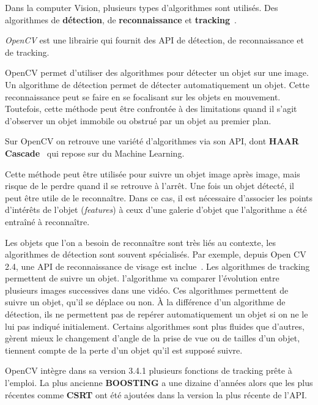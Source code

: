        Dans la computer Vision, plusieurs types d'algorithmes sont utilisés. Des algorithmes de \textbf{détection}, de \textbf{reconnaissance} et \textbf{tracking}~\cite{Reco}.

    \textit{OpenCV} est une librairie qui fournit des API de détection, de reconnaissance et de tracking.
    
        OpenCV permet d'utiliser des algorithmes pour détecter un objet sur une image. Un algorithme de détection permet de détecter automatiquement un objet. Cette reconnaissance peut se faire en se focalisant sur les objets en mouvement. Toutefois, cette méthode peut être confrontée à des limitations quand il s'agit d'observer un objet immobile ou obstrué par un objet au premier plan.

Sur OpenCV on retrouve une variété d'algorithmes via son API, dont \textbf{HAAR Cascade}~\cite{HaarOpenCV} qui repose sur du Machine Learning.

Cette méthode peut être utilisée pour suivre un objet image après image, mais risque de le perdre quand il se retrouve à l'arrêt.
        Une fois un objet détecté, il peut être utile de le reconnaître. Dans ce cas, il est nécessaire d'associer les points d’intérêts de l'objet (\textit{features}) à ceux d'une galerie d'objet que l'algorithme a été entraîné à reconnaître.
        
  Les objets que l'on a besoin de reconnaître sont très liés au contexte, les algorithmes de détection sont souvent spécialisés.  Par exemple, depuis Open CV 2.4, une API de reconnaissance de visage est inclue~\cite{FaceReco}.
    Les algorithmes de tracking permettent de suivre un objet. l'algorithme va comparer l'évolution entre plusieurs images successives dans une vidéo. Ces algorithmes permettent de suivre un objet, qu'il se déplace ou non. À la différence d'un algorithme de détection, ils ne permettent pas de repérer automatiquement un objet si on ne le lui pas indiqué initialement. Certains algorithmes sont plus fluides que d'autres, gèrent mieux le changement d'angle de la prise de vue ou de tailles d'un objet, tiennent compte de la perte d'un objet qu'il est supposé suivre.
    
  OpenCV intègre dans sa version 3.4.1 plusieurs fonctions de tracking prête à l'emploi. La plus ancienne \textbf{BOOSTING} a une dizaine d'années alors que les plus récentes comme \textbf{CSRT} ont été ajoutées dans la version la plus récente de l'API.~\cite{APItracking}  
                

